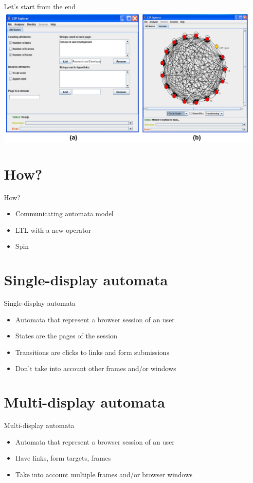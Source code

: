 \documentclass[usenames,dvipsnames]{beamer}
\begin{document}
\begin{frame}{Let's start from the end}
  \includegraphics[width=\textwidth]{../img/screenshot_tool.png}
\end{frame}


\section{How?}
\begin{frame}{How?}

  \begin{itemize}
    \item Communicating automata model
    \item LTL with a new operator
    \item Spin
  \end{itemize}
\end{frame}

\section{Single-display automata}
\begin{frame}{Single-display automata}
  \begin{itemize}
    \item Automata that represent a browser session of an user
    \item States are the pages of the session
    \item Transitions are clicks to links and form submissions
    \item Don't take into account other frames and/or windows
  \end{itemize}
\end{frame}

\section{Multi-display automata}
\begin{frame}{Multi-display automata}
  \begin{itemize}
    \item Automata that represent a browser session of an user
    \item Have links, form targets, frames
    \item Take into account multiple frames and/or browser windows
  \end{itemize}
\end{frame}
\end{document}
